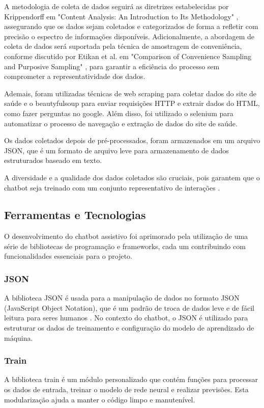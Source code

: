 \documentclass[conference]{IEEEtran}
\begin{document}
A metodologia de coleta de dados seguirá as diretrizes estabelecidas 
por Krippendorff em "Content Analysis: An Introduction to Its Methodology" \cite{Krippendorff2013}, 
assegurando que os dados sejam coletados e categorizados de forma a refletir 
com precisão o espectro de informações disponíveis. 
Adicionalmente, a abordagem de coleta de dados será suportada pela técnica de amostragem de conveniência, 
conforme discutido por Etikan et al. em "Comparison of Convenience Sampling and Purposive Sampling" \cite{Etikan2016}, 
para garantir a eficiência do processo sem comprometer a representatividade dos dados.

Ademais, foram utilizadas técnicas de web scraping para coletar dados do site de saúde e o 
beautyfulsoup para enviar requisições HTTP e extrair dados do HTML, como fazer perguntas no google. Além disso,
foi utilizado o selenium para automatizar o processo de navegação e extração de dados do site de saúde.

Os dados coletados depois de pré-processados, foram armazenados em um arquivo JSON, 
que é um formato de arquivo leve para armazenamento de dados estruturados baseado em texto.

A diversidade e a qualidade dos dados coletados são cruciais, 
pois garantem que o chatbot seja treinado com um conjunto representativo de interações \cite{Lopez2018}.



\subsection{Ferramentas e Tecnologias}

O desenvolvimento do chatbot assistivo foi aprimorado pela utilização de uma série de 
bibliotecas de programação e frameworks, 
cada um contribuindo com funcionalidades essenciais para o projeto.

\subsubsection{JSON}
A biblioteca JSON é usada para a manipulação de dados no 
formato JSON (JavaScript Object Notation), que é um padrão de troca de dados leve e de fácil leitura 
para seres humanos \cite{Crockford2006}. 
No contexto do chatbot, o JSON é utilizado para estruturar os dados 
de treinamento e configuração do modelo de aprendizado de máquina.

\subsubsection{Train}
A biblioteca train é um módulo personalizado que contém funções para processar os dados de entrada, 
treinar o modelo de rede neural e realizar previsões. 
Esta modularização ajuda a manter o código limpo e manutenível.
\end{document}
